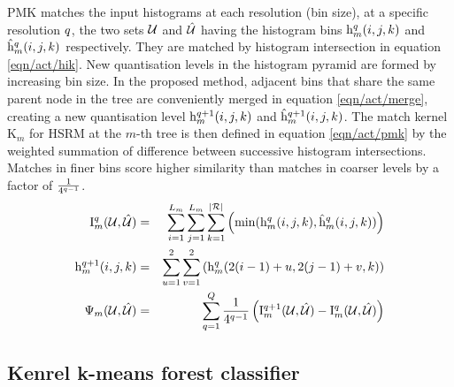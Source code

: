 PMK matches the input histograms at each resolution (bin size), at a specific resolution $q$, the two sets $\mathcal{U}$ and $\mathcal{\hat{U}}$ having the histogram bins $\mathrm{h}^q_{m}(i,j,k)$ and $\mathrm{\hat{h}}^q_{m}(i,j,k)$ respectively. They are matched by histogram intersection in equation \ref{eqn/act/hik}. New quantisation levels in the histogram pyramid are formed by increasing bin size. In the proposed method, adjacent bins that share the same parent node in the tree are conveniently merged in equation \ref{eqn/act/merge}, creating a new quantisation level $\mathrm{h}^{q+1}_m(i,j,k)$ and $\mathrm{\hat{h}}^{q+1}_m(i,j,k)$. The match kernel $\mathrm{K}_m$ for HSRM at the $m$-th tree is then defined in equation \ref{eqn/act/pmk} by the weighted summation of difference between successive histogram intersections. Matches in finer bins score higher similarity than matches in coarser levels by a factor of $\frac{1}{4^{q-1}}$.
\begin{align}
	\label{eqn/act/hik}
	\mathrm{I}_{m}^q(\mathcal{U},\mathcal{\hat{U}}) &= & \displaystyle\sum_{i=1}^{L_m}\sum_{j=1}^{L_m}\sum_{k=1}^{|\mathcal{R}|} \left( \min(\mathrm{h}^{q}_m(i,j,k), \mathrm{\hat{h}}^{q}_m(i,j,k)) \right)\\
	\label{eqn/act/merge}
	\mathrm{h}^{q+1}_m(i,j,k) &= & \displaystyle\sum_{u=1}^{2}\sum_{v=1}^{2} \left( \mathrm{h}^{q}_m(2(i-1)+u,2(j-1)+v,k) \right)\\
	\label{eqn/act/pmk}
	\Psi_m(\mathcal{U},\mathcal{\hat{U}}) &= & \displaystyle\sum_{q = 1}^{Q}\frac{1}{4^{q-1}} \left( \mathrm{I}_{m}^{q+1}(\mathcal{U},\mathcal{\hat{U}}) - \mathrm{I}_{m}^{q}(\mathcal{U},\mathcal{\hat{U}}) \right)
\end{align}

\subsection{Kenrel k-means forest classifier}

